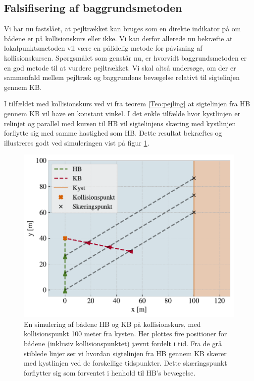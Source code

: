 \documentclass[%
 reprint,
nofootinbib,
aps,
]{revtex4-1}
\begin{document}
\subsection{Falsifisering af baggrundsmetoden}
Vi har nu fastslået, at pejltrækket kan bruges som en direkte indikator på om bådene er på kollisionskurs eller ikke. Vi kan derfor allerede nu bekræfte at lokalpunktsmetoden vil være en pålidelig metode for påvisning af kollisionskursen. Spørgsmålet som genstår nu, er hvorvidt baggrundsmetoden er en god metode til at vurdere pejltrækket. Vi skal altså undersøge, om der er sammenfald mellem pejltræk og baggrundens bevægelse relativt til sigtelinjen gennem KB. \par
I tilfældet med kollisionskurs ved vi fra teorem \ref{Teo:pejling} at sigtelinjen fra HB gennem KB vil have en konstant vinkel. I det enkle tilfælde hvor kystlinjen er relinjet og parallel med kursen til HB vil sigtelinjens skæring med kystlinjen forflytte sig med samme hastighed som HB. Dette resultat bekræftes og illustreres godt ved simuleringen vist på figur \ref{fig:eks1}.
\begin{figure}[H]
 \includegraphics[width=\linewidth]{figures/eksempel1.pdf}
 \caption{En simulering af bådene HB og KB på kollisionskurs, med kollisionspunkt 100 meter fra kysten. Her plottes fire positioner for bådene (inklusiv kollisionspunktet) jævnt fordelt i tid. Fra de grå stiblede linjer ser vi hvordan sigtelinjen fra HB gennem KB skærer med kystlinjen ved de forskellige tidspunkter. Dette skæringspunkt forflytter sig som forventet i henhold til HB's bevægelse.}
 \label{fig:eks1}
\end{figure}
\end{document}
